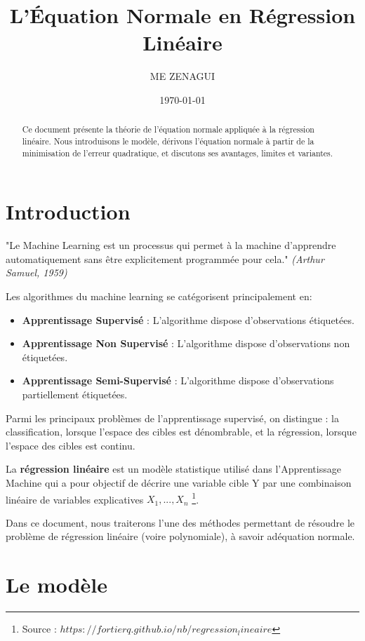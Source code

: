 \documentclass[12pt]{article}
\begin{document}
\title{L'Équation Normale en Régression Linéaire}
\author{ME ZENAGUI}
\date{\today}
\maketitle

\begin{abstract}
Ce document présente la théorie de l'équation normale appliquée à la régression linéaire. 
Nous introduisons le modèle, dérivons l'équation normale à partir de la minimisation de l'erreur quadratique, 
et discutons ses avantages, limites et variantes.
\end{abstract}

\tableofcontents
\newpage
\section{Introduction}
"Le Machine Learning est un processus qui permet à la machine d'apprendre automatiquement sans être explicitement programmée pour cela." \textit{(Arthur Samuel, 1959)}


Les algorithmes du machine learning se catégorisent principalement en:
\begin{itemize}
    \item \textbf{Apprentissage Supervisé} : L’algorithme dispose d’observations étiquetées.
    \item \textbf{Apprentissage Non Supervisé} : L’algorithme dispose d’observations non étiquetées.
    \item \textbf{Apprentissage Semi-Supervisé} : L’algorithme dispose d’observations partiellement étiquetées.
\end{itemize}


Parmi les principaux problèmes de l’apprentissage supervisé, on distingue : la classification, lorsque l’espace des cibles est dénombrable, et la régression, lorsque l’espace des cibles est continu.

 
La \textbf{régression linéaire} est un modèle statistique utilisé dans l'Apprentissage Machine qui a pour objectif de décrire une variable cible Y par une combinaison linéaire de variables explicatives $X_1, ..., X_n$ \footnote{Source : $https://fortierq.github.io/nb/regression_lineaire$}. 


Dans ce document, nous traiterons l’une des méthodes permettant de résoudre le problème de régression linéaire (voire polynomiale), à savoir adéquation normale. 

\section{Le modèle}
\end{document}
